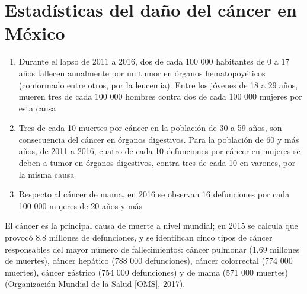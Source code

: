 \documentclass{beamer}
\begin{document}
\section{Estadísticas del daño del cáncer en México}

\begin{frame}
	
	\begin{enumerate}
		\item Durante el lapso de 2011 a 2016, dos de cada 100 000 habitantes de 0 a 17 años
		fallecen anualmente por un tumor en órganos hematopoyéticos (conformado
		entre otros, por la leucemia). Entre los jóvenes de 18 a 29 años, mueren tres de
		cada 100 000 hombres contra dos de cada 100 000 mujeres por esta causa
		\item Tres de cada 10 muertes por cáncer en la población de 30 a 59 años, son
		consecuencia del cáncer en órganos digestivos. Para la población de 60 y más
		años, de 2011 a 2016, cuatro de cada 10 defunciones por cáncer en mujeres se
		deben a tumor en órganos digestivos, contra tres de cada 10 en varones, por la
		misma causa
		\item Respecto al cáncer de mama, en 2016 se observan 16 defunciones por cada
		100 000 mujeres de 20 años y más
	\end{enumerate}
	
\end{frame}

\begin{frame}	
	
	\begin{block}{}
		El cáncer es la principal causa de muerte a nivel mundial; en 2015 se calcula que provocó 8.8
		millones de defunciones, y se identifican cinco tipos de cáncer responsables del mayor número de
		fallecimientos: cáncer pulmonar (1,69 millones de muertes), cáncer hepático (788 000 defunciones),
		cáncer colorrectal (774 000 muertes), cáncer gástrico (754 000 defunciones) y de mama (571 000
		muertes) (Organización Mundial de la Salud [OMS], 2017).
	\end{block}
\end{frame}



\end{document}

